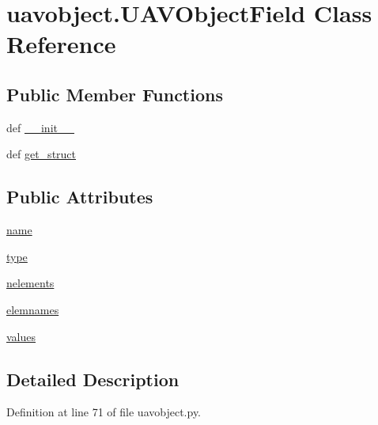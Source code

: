 \hypertarget{classuavobject_1_1_u_a_v_object_field}{\section{uavobject.\-U\-A\-V\-Object\-Field \-Class \-Reference}
\label{classuavobject_1_1_u_a_v_object_field}
}
\subsection*{\-Public \-Member \-Functions}
\begin{DoxyCompactItemize}
\item 
def \hyperlink{classuavobject_1_1_u_a_v_object_field_acf43e94abcf1a399fa8ca600c45e9415}{\-\_\-\-\_\-init\-\_\-\-\_\-}
\item 
def \hyperlink{classuavobject_1_1_u_a_v_object_field_a4abee82c924e2fa17da4dfa6ade368bf}{get\-\_\-struct}
\end{DoxyCompactItemize}
\subsection*{\-Public \-Attributes}
\begin{DoxyCompactItemize}
\item 
\hyperlink{classuavobject_1_1_u_a_v_object_field_a9b3f1adb03ed4293915011faf9ed93a9}{name}
\item 
\hyperlink{classuavobject_1_1_u_a_v_object_field_acc9aa14ec01184df177b6ef907073d1f}{type}
\item 
\hyperlink{classuavobject_1_1_u_a_v_object_field_a1041dbb74c1678d16fba30515fb1f47c}{nelements}
\item 
\hyperlink{classuavobject_1_1_u_a_v_object_field_a811dd2d5039fa7abbd22558619c2b363}{elemnames}
\item 
\hyperlink{classuavobject_1_1_u_a_v_object_field_a72f9d575e9fd6eaeb6842377e76ec8fe}{values}
\end{DoxyCompactItemize}


\subsection{\-Detailed \-Description}


\-Definition at line 71 of file uavobject.\-py.



